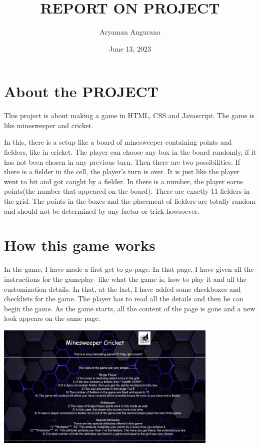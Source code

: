 \documentclass{article}
\title{REPORT ON PROJECT}
\author{Aryaman Angurana}
\date{June 13, 2023}
\begin{document}
\maketitle

\section*{About the PROJECT}

This project is about making a game in HTML, CSS and Javascript. The game is like minesweeper and cricket.

In this, there is a setup like a board of minesweeper containing points and fielders, like in cricket. The player can choose any box in the board randomly, if it has not been chosen in any previous turn. Then there are two possibilities. If there is a fielder in the cell, the player's turn is over. It is just like the player went to hit and got caught by a fielder. In there is a number, the player earns points(the number that appeared on the board). There are exactly 11 fielders in the grid. The points in the boxes and the placement of fielders are totally random and should not be determined by any factor or trick howsoever. 

\section*{How this game works}

In the game, I have made a first get to go page. In that page, I have given all the instructions for the gameplay- like what the game is, how to play it and all the customization details. In that, at the last, I have added some checkboxes and checklists for the game. The player has to read all the details and then he can begin the game. As the game starts, all the content of the page is gone and a new look appears on the same page. 

\includegraphics[width=0.8\textwidth]{image1.png}
\end{document}
